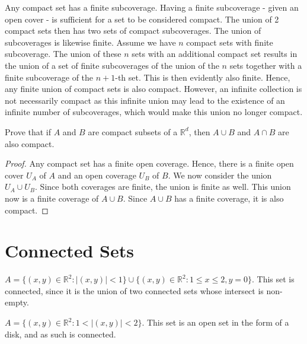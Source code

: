 \documentclass[12pt]{book}
\newcommand{\R}{\mathbb{R}}
\newenvironment{exercise}[2][Exercise]{\begin{trivlist}
\item[\hskip \labelsep {\bfseries #1}\hskip \labelsep {\bfseries #2.}]}{\end{trivlist}}
\begin{document}
\begin{exercise}{7.2.7}
\begin{exercise}{7.4.9}
Any compact set has a finite subcoverage. Having a finite subcoverage - given an open cover - is sufficient for a set to be considered compact. The union of 2 compact sets then has two sets of compact subcoverages. The union of subcoverages is likewise finite. Assume we have $n$ compact sets with finite subcoverage. The union of these $n$ sets with an additional compact set results in the union of a set of finite subcoverages of the union of the $n$ sets together with a finite subcoverage of the $n+1$-th set. This is then evidently also finite. Hence, any finite union of compact sets is also compact. However, an infinite collection is not necessarily compact as this infinite union may lead to the existence of an infinite number of subcoverages, which would make this union no longer compact.
\end{exercise}



\begin{exercise}{7.4.10}
Prove that if $A$ and $B$ are compact subsets of a $\R^d$, then $A \cup B $ and $A \cap B$ are also compact.
\begin{proof}
    Any compact set has a finite open coverage. Hence, there is a finite open cover $U_A$ of $A$ and an open coverage $U_B$ of $B$. We now consider the union $U_A \cup U_B$. Since both coverages are finite, the union is finite as well. This union now is a finite coverage of $A \cup B$. Since $A \cup B$ has a finite coverage, it is also compact.
\end{proof}
\end{exercise}


\section{Connected Sets}

\begin{exercise}{7.5.1}
$A = \{ (x,y) \in \R^2 : |(x,y)| < 1 \} \cup \{ (x,y) \in \R^2 : 1 \leq x \leq 2, y= 0 \}.$
This set is connected, since it is the union of two connected sets whose intersect is non-empty.
\end{exercise}



\begin{exercise}{7.5.3}
$A= \{ (x,y) \in \R^2 : 1 < |(x,y)| < 2 \}$.
This set is an open set in the form of a disk, and as such is connected.
\end{exercise}




\end{exercise}
\end{document}

